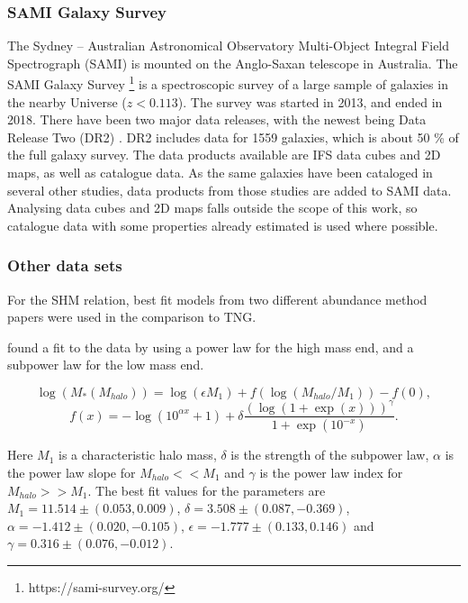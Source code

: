 \subsubsection{SAMI Galaxy Survey}
The Sydney – Australian Astronomical Observatory Multi-Object Integral Field Spectrograph (SAMI) is mounted on the Anglo-Saxan telescope in Australia. The SAMI Galaxy Survey \footnote{https://sami-survey.org/} is a spectroscopic survey of a large sample of galaxies in the nearby Universe ($z < 0.113$). The survey was started in 2013, and ended in 2018. There have been two major data releases, with the newest being Data Release Two (DR2) \parencite{Scott2018}. DR2 includes data for 1559 galaxies, which is about 50 \% of the full galaxy survey. The data products available are IFS data cubes and 2D maps, as well as catalogue data. As the same galaxies have been cataloged in several other studies, data products from those studies are added to SAMI data. Analysing data cubes and 2D maps falls outside the scope of this work, so catalogue data with some properties already estimated is used where possible. 

\subsubsection{Other data sets}
For the SHM relation, best fit models from two different abundance method papers were used in the comparison to TNG.

\textcite{Behroozi2013} found a fit to the data by using a power law for the high mass end, and a subpower law for the low mass end.

\begin{equation} \label{eq_behroozi}
    \log(M_*(M_{halo})) = \log(\epsilon M_1) + f(\log(M_{halo}/M_1)) -f(0),
\end{equation}
\begin{equation*}
    f(x) = -\log(10^{\alpha x}+1)+\delta \frac{(\log(1+\exp(x)))^\gamma}{1 +\exp(10^{-x})}.
\end{equation*}

Here $M_1$ is a characteristic halo mass, $\delta$ is the strength of the subpower law, $\alpha$ is the power law slope for $M_{halo} << M_1$ and $\gamma$ is the power law index for $M_{halo} >> M_1$. The best fit values for the parameters are $M_1 = 11.514\pm(0.053, 0.009)$, $\delta = 3.508 \pm (0.087, -0.369)$, $\alpha = -1.412 \pm (0.020, -0.105)$, $\epsilon = -1.777 \pm (0.133, 0.146)$ and $\gamma = 0.316 \pm (0.076, -0.012)$.

